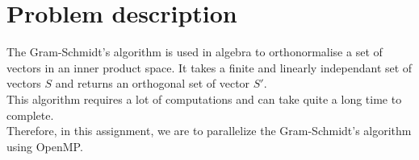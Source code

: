 \chapter{Problem description}

The Gram-Schmidt's algorithm is used in algebra to orthonormalise a set of vectors in an inner product space. It takes a finite and linearly independant set of vectors $S$ and returns an orthogonal set of vector $S'$.\\

This algorithm requires a lot of computations and can take quite a long time to complete.\\

Therefore, in this assignment, we are to parallelize the Gram-Schmidt's algorithm using OpenMP.
